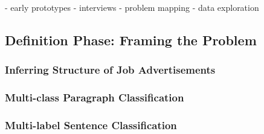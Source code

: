 - early prototypes
- interviews
- problem mapping
- data exploration

\subsection{Definition Phase: Framing the Problem}
\label{sub:Definition Phase: Framing the Problem}

\subsubsection*{Inferring Structure of Job Advertisements}
\label{subs:Inferring Structure in Job Advertisements}

\subsubsection*{Multi-class Paragraph Classification}
\label{subs:Multi-class Paragraph Classification}

\subsubsection*{Multi-label Sentence Classification}
\label{subs:Multi-label Sentence Classification}



%
%
%
%






